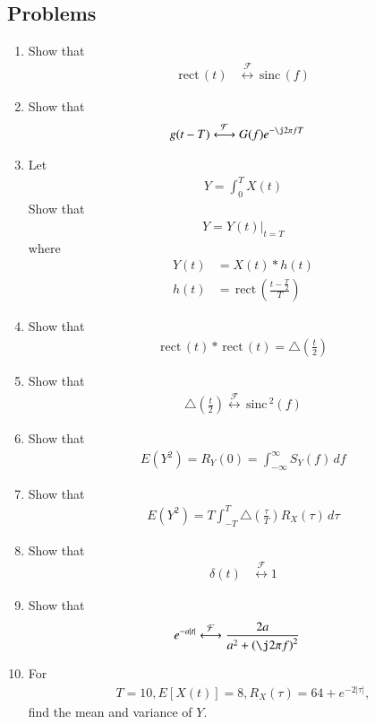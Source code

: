 \documentclass[journal,12pt,onecolumn]{IEEEtran}
\renewcommand\thesection{\arabic{section}}
\renewcommand\thesubsection{\thesection.\arabic{subsection}}
\providecommand{\sbrak}[1]{\ensuremath{{}\left[#1\right]}}
\providecommand{\brak}[1]{\ensuremath{\left(#1\right)}}
\theoremstyle{remark}
\providecommand{\abs}[1]{\left\vert#1\right\vert}
\providecommand{\system}[1]{\overset{\mathcal{#1}}{ \longleftrightarrow}}
\newcommand{\sinc}{\,\text{sinc}\,}
\newcommand{\rect}{\,\text{rect}\,}
\numberwithin{equation}{section}
\begin{document}
 \subsection{Problems}
\begin{enumerate}[label=\arabic*.,ref=\thesubsection.\theenumi]
\item Show that 
	\begin{align}
		\rect(t) &\system{F}\sinc(f)	
	\end{align}
\item Show that 
	\begin{align}
		g(t-T) &\system{F}G(f)e^{-\j 2\pi f T}
	\end{align}
\item Let 
	\begin{align}
		Y = \int^{T}_{0}X(t)
	\end{align}
	Show that 
	\begin{align}
		Y = Y(t)\vert_{t=T}
	\end{align}
	where
	\begin{align}
		Y(t) &= X(t)*h(t)
		\\
		h(t) &= \rect\brak{\frac{t-\frac{T}{2}}{T}}
	\end{align}
\item Show that 
	\begin{align}
		\rect(t)*\rect(t) = \triangle\brak{\frac{t}{2}}
	\end{align}
\item Show that 
	\begin{align}
		\triangle\brak{\frac{t}{2}}\system{F} \sinc^2(f)
	\end{align}
\item Show that 
	\begin{align}
		E\brak{Y^2} = R_Y(0) =
		\int_{-\infty}^{\infty}S_Y(f)\,df
	\end{align}
\item Show that 
	\begin{align}
		E\brak{Y^2} = T\int_{-T}^{T}	\triangle\brak{\frac{\tau}{T}}R_X(\tau)\, d\tau
	\end{align}
\item Show that
	\begin{align}
		\delta(t) &\system{F} 1	
	\end{align}
\item Show that 
	\begin{align}
		e^{-a\abs{t}}&\system{F} \frac{2a}{a^2 + \brak{\j2\pi f}^2}	
	\end{align}
\item For 
	\begin{align}
	T = 10, E\sbrak{X(t)} = 8, R_X\brak{\tau} = 64+e^{-2\abs{\tau}},
	\end{align}
		find the mean and variance of $Y$.
 \end{enumerate}
\end{document}
